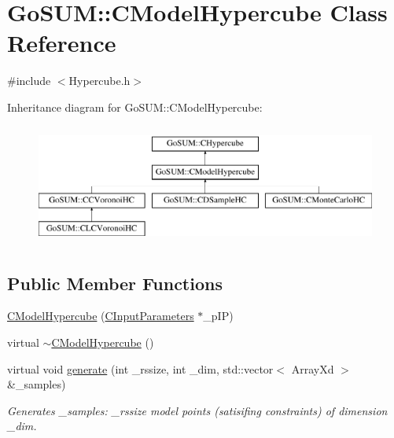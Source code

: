 \hypertarget{class_go_s_u_m_1_1_c_model_hypercube}{\section{Go\-S\-U\-M\-:\-:C\-Model\-Hypercube Class Reference}
\label{class_go_s_u_m_1_1_c_model_hypercube}
}


{\ttfamily \#include $<$Hypercube.\-h$>$}

Inheritance diagram for Go\-S\-U\-M\-:\-:C\-Model\-Hypercube\-:\begin{figure}[H]
\begin{center}
\leavevmode
\includegraphics[height=4.000000cm]{class_go_s_u_m_1_1_c_model_hypercube}
\end{center}
\end{figure}
\subsection*{Public Member Functions}
\begin{DoxyCompactItemize}
\item 
\hyperlink{class_go_s_u_m_1_1_c_model_hypercube_ab16030ca1067a265077a762fb56caf46}{C\-Model\-Hypercube} (\hyperlink{class_go_s_u_m_1_1_c_input_parameters}{C\-Input\-Parameters} $\ast$\-\_\-p\-I\-P)
\item 
virtual \hyperlink{class_go_s_u_m_1_1_c_model_hypercube_aa7ab99f4bad3c65123675a2d29c7cf87}{$\sim$\-C\-Model\-Hypercube} ()
\item 
virtual void \hyperlink{class_go_s_u_m_1_1_c_model_hypercube_acd201b7a6dcab576a907f85c127fa6ce}{generate} (int \-\_\-rssize, int \-\_\-dim, std\-::vector$<$ Array\-Xd $>$ \&\-\_\-samples)
\begin{DoxyCompactList}\small\item\em Generates \-\_\-samples\-: \-\_\-rssize model points (satisifing constraints) of dimension \-\_\-dim. \end{DoxyCompactList}\end{DoxyCompactItemize}
